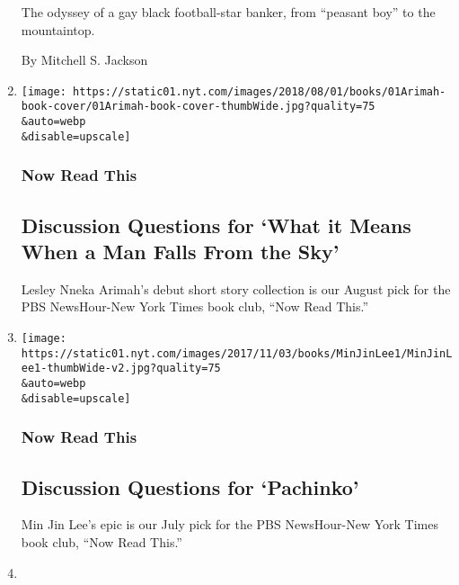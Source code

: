 \begin{enumerate}
  The odyssey of a gay black football-star banker, from ``peasant boy''
  to the mountaintop.

  By Mitchell S. Jackson
\item
  \href{/2018/08/01/books/lesley-nneka-arimah-what-means-when-man-falls-from-sky.html}{}

  \texttt{[image: https://static01.nyt.com/images/2018/08/01/books/01Arimah-book-cover/01Arimah-book-cover-thumbWide.jpg?quality=75\\\&auto=webp\\\&disable=upscale]}

  \hypertarget{now-read-this-9}{%
  \subsubsection{Now Read This}\label{now-read-this-9}}

  \hypertarget{discussion-questions-for-what-it-means-when-a-man-falls-from-the-sky}{%
  \subsection{Discussion Questions for `What it Means When a Man Falls
  From the
  Sky'}\label{discussion-questions-for-what-it-means-when-a-man-falls-from-the-sky}}

  Lesley Nneka Arimah's debut short story collection is our August pick
  for the PBS NewsHour-New York Times book club, ``Now Read This.''
\item
  \href{/2018/07/03/books/discussion-questions-for-pachinko.html}{}

  \texttt{[image: https://static01.nyt.com/images/2017/11/03/books/MinJinLee1/MinJinLee1-thumbWide-v2.jpg?quality=75\\\&auto=webp\\\&disable=upscale]}

  \hypertarget{now-read-this-10}{%
  \subsubsection{Now Read This}\label{now-read-this-10}}

  \hypertarget{discussion-questions-for-pachinko}{%
  \subsection{Discussion Questions for
  `Pachinko'}\label{discussion-questions-for-pachinko}}

  Min Jin Lee's epic is our July pick for the PBS NewsHour-New York
  Times book club, ``Now Read This.''
\item
  \href{/2018/06/15/books/literary-parties-book-expo.html}{}


\end{enumerate}
